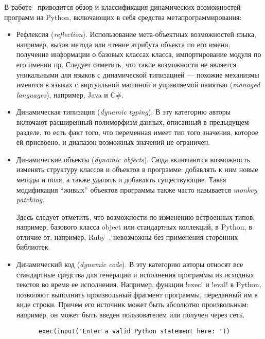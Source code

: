 В работе~\cite[]{Holkner2009} приводится обзор и классификация динамических
возможностей программ на Python, включающих в себя средства
метапрограммирования: 

\begin{itemize}
  \item{%
      Рефлексия (\emph{reflection}). 
      Использование мета-объектных возможностей языка, например,
      вызов метода или чтение атрибута объекта по его имени, получение
      информации о базовых классах класса, импортирование модуля по его имении
      пр. Следует отметить, что такие возможности не является уникальными для
      языков с динамической типизацией --- похожие механизмы имеются в языках с
      виртуальной машиной и управляемой памятью (\emph{managed languages}),
      например, Java и C\#.
    }
  \item{%
      Динамическая типизация (\emph{dynamic typing}). 
      В эту категорию авторы включают расширенный полиморфизм данных, описанный
      в предыдущем разделе, то есть факт того, что переменная имеет тип того
      значения, которое ей присвоено, и диапазон возможных значений не
      ограничен.
    }
  \item{%
      Динамические объекты (\emph{dynamic objects}).
      Сюда включаются возможность изменять структуру классов и объектов в
      программе: добавлять к ним новые методы и поля, а также удалять и добавлять
      существующие. Такая модификация ``живых'' объектов программы также часто
      называется \emph{monkey patching}.

      Здесь следует отметить, что возможности по изменению встроенных
      типов, например, базового класса object или стандартных коллекций, в Python, в
      отличие от, например, Ruby~\cite{Madsen2007}, невозможны без применения сторонних библиотек.
    }
  \item{  
      Динамический код (\emph{dynamic code}).
      В эту категорию авторы относят все стандартные средства для генерации и
      исполнения программы из исходных текстов во время ее исполнения.
      Например, функции !exec! и !eval! в Python, позволяют выполнить
      произвольный фрагмент программы, переданный им в виде строки.  Причем его
      источник может быть абсолютно произвольным: например, он может быть введен
      пользователем или получен через сеть.

      \begin{lstlisting}
      exec(input('Enter a valid Python statement here: '))  
      \end{lstlisting}

}
\end{itemize}
